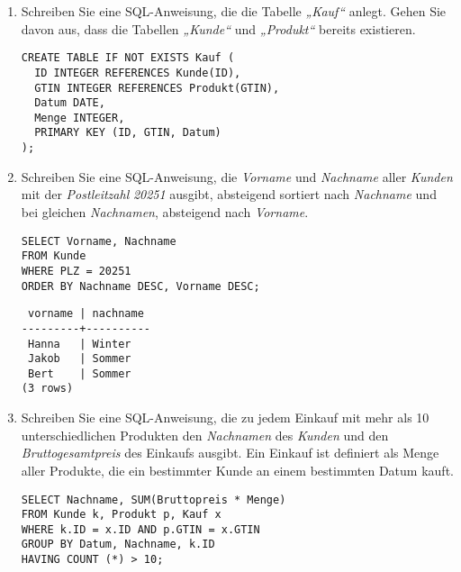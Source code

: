 \documentclass{bschlangaul-aufgabe}
\begin{document}
\begin{enumerate}


\item Schreiben Sie eine SQL-Anweisung, die die Tabelle \emph{„Kauf“}
anlegt. Gehen Sie davon aus, dass die Tabellen \emph{„Kunde“} und
\emph{„Produkt“} bereits existieren.

\begin{bAntwort}
\begin{verbatim}
CREATE TABLE IF NOT EXISTS Kauf (
  ID INTEGER REFERENCES Kunde(ID),
  GTIN INTEGER REFERENCES Produkt(GTIN),
  Datum DATE,
  Menge INTEGER,
  PRIMARY KEY (ID, GTIN, Datum)
);
\end{verbatim}
\end{bAntwort}


\item Schreiben Sie eine SQL-Anweisung, die \emph{Vorname} und
\emph{Nachname} aller \emph{Kunden} mit der \emph{Postleitzahl}
\emph{20251} ausgibt, absteigend sortiert nach \emph{Nachname} und bei
gleichen \emph{Nachnamen}, absteigend nach \emph{Vorname}.

\begin{bAntwort}
\begin{verbatim}
SELECT Vorname, Nachname
FROM Kunde
WHERE PLZ = 20251
ORDER BY Nachname DESC, Vorname DESC;
\end{verbatim}

\begin{verbatim}
 vorname | nachname
---------+----------
 Hanna   | Winter
 Jakob   | Sommer
 Bert    | Sommer
(3 rows)
\end{verbatim}
\end{bAntwort}


\item Schreiben Sie eine SQL-Anweisung, die zu jedem Einkauf mit mehr
als 10 unterschiedlichen Produkten den \emph{Nachnamen} des
\emph{Kunden} und den \emph{Bruttogesamtpreis} des Einkaufs ausgibt. Ein
Einkauf ist definiert als Menge aller Produkte, die ein bestimmter Kunde
an einem bestimmten Datum kauft.

\begin{bAntwort}
\begin{verbatim}
SELECT Nachname, SUM(Bruttopreis * Menge)
FROM Kunde k, Produkt p, Kauf x
WHERE k.ID = x.ID AND p.GTIN = x.GTIN
GROUP BY Datum, Nachname, k.ID
HAVING COUNT (*) > 10;
\end{verbatim}


\end{bAntwort}
\end{enumerate}
\end{document}
